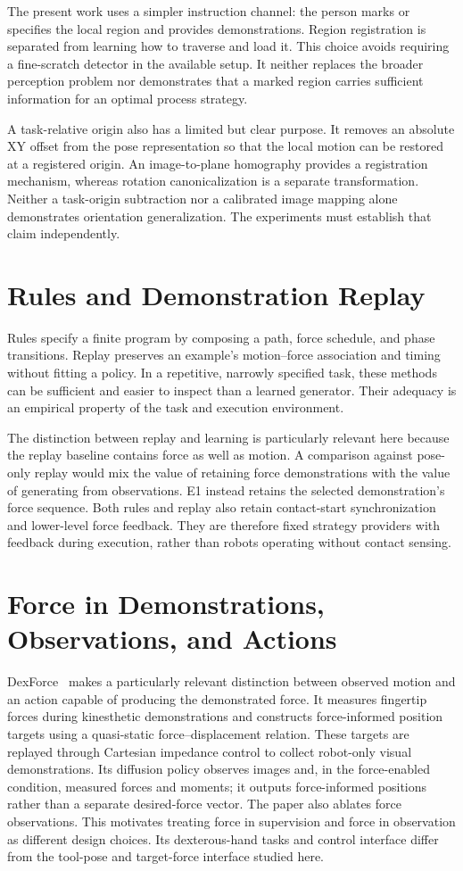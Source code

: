 The present work uses a simpler instruction channel: the person marks or specifies the local region and provides demonstrations. Region registration is separated from learning how to traverse and load it. This choice avoids requiring a fine-scratch detector in the available setup. It neither replaces the broader perception problem nor demonstrates that a marked region carries sufficient information for an optimal process strategy.

A task-relative origin also has a limited but clear purpose. It removes an absolute XY offset from the pose representation so that the local motion can be restored at a registered origin. An image-to-plane homography provides a registration mechanism, whereas rotation canonicalization is a separate transformation. Neither a task-origin subtraction nor a calibrated image mapping alone demonstrates orientation generalization. The experiments must establish that claim independently.

\section{Rules and Demonstration Replay}
Rules specify a finite program by composing a path, force schedule, and phase transitions. Replay preserves an example's motion--force association and timing without fitting a policy. In a repetitive, narrowly specified task, these methods can be sufficient and easier to inspect than a learned generator. Their adequacy is an empirical property of the task and execution environment.

The distinction between replay and learning is particularly relevant here because the replay baseline contains force as well as motion. A comparison against pose-only replay would mix the value of retaining force demonstrations with the value of generating from observations. E1 instead retains the selected demonstration's force sequence. Both rules and replay also retain contact-start synchronization and lower-level force feedback. They are therefore fixed strategy providers with feedback during execution, rather than robots operating without contact sensing.

\section{Force in Demonstrations, Observations, and Actions}
DexForce~\cite{chen2025dexforce} makes a particularly relevant distinction between observed motion and an action capable of producing the demonstrated force. It measures fingertip forces during kinesthetic demonstrations and constructs force-informed position targets using a quasi-static force--displacement relation. These targets are replayed through Cartesian impedance control to collect robot-only visual demonstrations. Its diffusion policy observes images and, in the force-enabled condition, measured forces and moments; it outputs force-informed positions rather than a separate desired-force vector. The paper also ablates force observations. This motivates treating force in supervision and force in observation as different design choices. Its dexterous-hand tasks and control interface differ from the tool-pose and target-force interface studied here.

